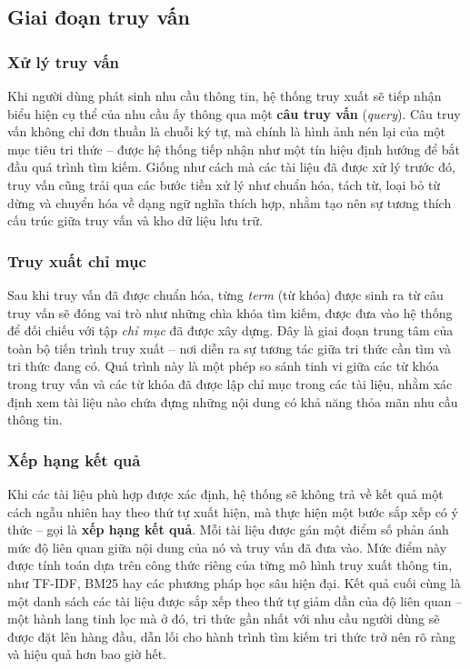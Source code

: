 \subsection{Giai đoạn truy vấn}
\subsubsection{Xử lý truy vấn}
Khi người dùng phát sinh nhu cầu thông tin, hệ thống truy xuất sẽ tiếp nhận biểu hiện cụ thể của nhu cầu ấy thông qua một \textbf{câu truy vấn} (\textit{query}). Câu truy vấn không chỉ đơn thuần là chuỗi ký tự, mà chính là hình ảnh nén lại của một mục tiêu tri thức -- được hệ thống tiếp nhận như một tín hiệu định hướng để bắt đầu quá trình tìm kiếm. Giống như cách mà các tài liệu đã được xử lý trước đó, truy vấn cũng trải qua các bước tiền xử lý như chuẩn hóa, tách từ, loại bỏ từ dừng và chuyển hóa về dạng ngữ nghĩa thích hợp, nhằm tạo nên sự tương thích cấu trúc giữa truy vấn và kho dữ liệu lưu trữ.

\subsubsection{Truy xuất chỉ mục}
Sau khi truy vấn đã được chuẩn hóa, từng \textit{term} (từ khóa) được sinh ra từ câu truy vấn sẽ đóng vai trò như những chìa khóa tìm kiếm, được đưa vào hệ thống để đối chiếu với tập \textit{chỉ mục} đã được xây dựng. Đây là giai đoạn trung tâm của toàn bộ tiến trình truy xuất -- nơi diễn ra sự tương tác giữa tri thức cần tìm và tri thức đang có. Quá trình này là một phép so sánh tinh vi giữa các từ khóa trong truy vấn và các từ khóa đã được lập chỉ mục trong các tài liệu, nhằm xác định xem tài liệu nào chứa đựng những nội dung có khả năng thỏa mãn nhu cầu thông tin.

\subsubsection{Xếp hạng kết quả}
Khi các tài liệu phù hợp được xác định, hệ thống sẽ không trả về kết quả một cách ngẫu nhiên hay theo thứ tự xuất hiện, mà thực hiện một bước sắp xếp có ý thức -- gọi là \textbf{xếp hạng kết quả}. Mỗi tài liệu được gán một điểm số phản ánh mức độ liên quan giữa nội dung của nó và truy vấn đã đưa vào. Mức điểm này được tính toán dựa trên công thức riêng của từng mô hình truy xuất thông tin, như TF-IDF, BM25 hay các phương pháp học sâu hiện đại. Kết quả cuối cùng là một danh sách các tài liệu được sắp xếp theo thứ tự giảm dần của độ liên quan -- một hành lang tinh lọc mà ở đó, tri thức gần nhất với nhu cầu người dùng sẽ được đặt lên hàng đầu, dẫn lối cho hành trình tìm kiếm tri thức trở nên rõ ràng và hiệu quả hơn bao giờ hết.
